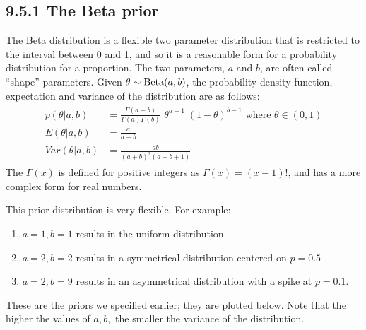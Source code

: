 \documentclass[letterpaper,10pt,english]{jupyterBook}
\begin{document}
\subsection{9.5.1 The Beta prior}
\label{\detokenize{09.f. Bayesian Statistics I:the-beta-prior}}
\sphinxAtStartPar
The Beta distribution is a flexible two parameter distribution that is restricted to the interval between 0 and 1, and so it is a reasonable form for a probability distribution for a proportion. The two parameters, \(a\) and \(b\), are often called  “shape” parameters. Given \(\theta \sim \hbox{Beta}(a,b)\), the probability density function, expectation and variance of the distribution are as follows:
\begin{equation*}
\begin{split}
\begin{align}
p(\theta|a, b)  &=  \frac{\Gamma(a+ b)}{ \Gamma(a)\Gamma(b) } \,\,
\theta^{a-1} \; (1-\theta)^{b-1}  \mbox{  where  } \theta \in (0,1) \\
{E}( \theta |a, b) &=    \frac{a}{a+ b }     \\
{Var}( \theta |a, b) &=    \frac{a b}{ (a+ b)^2 (a+ b+1)} 
\end{align}
\end{split}
\end{equation*}
\sphinxAtStartPar
The  \(\Gamma(x)\) is defined for positive integers as \(\Gamma (x)=(x-1)!\), and has a more complex form for real numbers.

\sphinxAtStartPar
This prior distribution is very flexible. For example:
\begin{enumerate}
%
\item {} 
\sphinxAtStartPar
\(a=1, b=1\) results in the uniform distribution

\item {} 
\sphinxAtStartPar
\(a=2, b=2\) results in a symmetrical distribution centered on \(p=0.5\)

\item {} 
\sphinxAtStartPar
\(a=2, b=9\) results in an asymmetrical distribution with a spike at \(p=0.1\).

\end{enumerate}

\sphinxAtStartPar
These are the priors we specified earlier; they are plotted below. Note that the higher the values of \(a, b,\) the
smaller the variance of the distribution.
\end{document}
